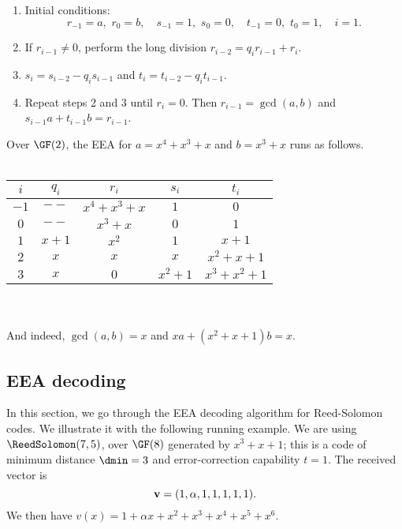 \documentclass[a4paper, 11pt, openany]{book}
\begin{document}
\begin{enumerate}
	\item Initial conditions:
	$$
		r_{-1} = a, \,\, r_0 = b, \quad s_{-1} = 1, \,\, s_0 = 0, \quad t_{-1} = 0, \,\, t_0 = 1, \quad i=1.
	$$

	\item If $r_{i-1} \ne 0$, perform the long division $r_{i-2} = q_i r_{i-1} + r_i$.

	\item $s_i = s_{i-2} - q_i s_{i-1}$ and $t_i = t_{i-2} - q_i t_{i-1}$.

	\item Repeat steps 2 and 3 until $r_i = 0$. Then $r_{i-1} = \gcd(a,b)$ and $s_{i-1}a + t_{i-1}b = r_{i-1}$.
\end{enumerate}


Over $\GF(2)$, the EEA for $a = x^4 + x^3 + x$ and $b = x^3 + x$ runs as follows.\\
~\\
\begin{tabular}{c|c|c|c|c}
    $i$   &  $q_i$  & $r_i$ & $s_i$ & $t_i$\\
    \hline
    $-1$  &  $--$   & $x^4 + x^3 + x$ & $1$ & $0$\\
    $0$   & $--$    & $x^3 + x$ & $0$ & $1$\\
    $1$ & $x+1$     & $x^2$ & $1$ & $x+1$\\
    $2$ & $x$        & $x$ & $x$ & $x^2 + x + 1$\\
    $3$ & $x$        & $0$ & $x^2 + 1$ & $x^3 + x^2 + 1$
\end{tabular}
~\\~\\
And indeed, $\gcd(a,b) = x$ and $xa + (x^2 + x + 1)b = x$.








\subsection{EEA decoding}

In this section, we go through the EEA decoding algorithm for Reed-Solomon codes. We illustrate it with the following running example. We are using $\ReedSolomon(7,5)$, over $\GF(8)$ generated by $x^3 + x + 1$; this is a code of minimum distance $\dmin = 3$ and error-correction capability $t=1$. The received vector is
\[
    {\bf v} = (1, \alpha, 1, 1, 1, 1, 1).
\]
We then have $v(x) = 1 + \alpha x + x^2 +  x^3 + x^4 + x^5 + x^6$.
\end{document}
